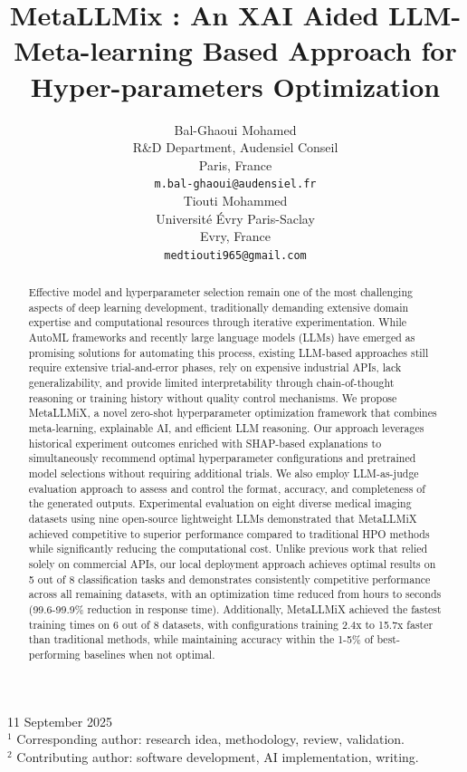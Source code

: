 \documentclass{article}
\title{MetaLLMix : An XAI Aided LLM-Meta-learning Based Approach for Hyper-parameters Optimization
}
\author{
  Bal-Ghaoui Mohamed \footnotemark[1]{} \\ %
  R\&D Department, Audensiel Conseil \\
  Paris, France \\
  \texttt{m.bal-ghaoui@audensiel.fr} \\
  \And
  Tiouti Mohammed \footnotemark[2]{} \\
  Université Évry Paris-Saclay \\%
  Evry, France\\
  \texttt{medtiouti965@gmail.com} \\
}
\begin{document}
\maketitle

\vspace{-1cm}
\begin{center}
    11 September 2025\\
    $^1$ Corresponding author: research idea, methodology, review, validation. \\
    $^2$ Contributing author: software development, AI implementation, writing. \\
\end{center}
\vspace{0.5cm}

\begin{abstract}
Effective model and hyperparameter selection remain one of the most challenging aspects of deep learning development, traditionally demanding extensive domain expertise and computational resources through iterative experimentation. While AutoML frameworks and recently large language models (LLMs) have emerged as promising solutions for automating this process, existing LLM-based approaches still require extensive trial-and-error phases, rely on expensive industrial APIs, lack generalizability, and provide limited interpretability through chain-of-thought reasoning or training history without quality control mechanisms.
We propose MetaLLMiX, a novel zero-shot hyperparameter optimization framework that combines meta-learning, explainable AI, and efficient LLM reasoning. Our approach leverages historical experiment outcomes enriched with SHAP-based explanations to simultaneously recommend optimal hyperparameter configurations and pretrained model selections without requiring additional trials.
We also employ LLM-as-judge evaluation approach to assess and control the format, accuracy, and completeness of the generated outputs.
Experimental evaluation on eight diverse medical imaging datasets using nine open-source lightweight LLMs demonstrated that MetaLLMiX achieved competitive to superior performance compared to traditional HPO methods while significantly reducing the computational cost. Unlike previous work that relied solely on commercial APIs, our local deployment approach achieves optimal results on 5 out of 8 classification tasks and demonstrates consistently competitive performance across all remaining datasets, with an optimization time reduced from hours to seconds (99.6-99.9\% reduction in response time). Additionally, MetaLLMiX achieved the fastest training times on 6 out of 8 datasets, with configurations training 2.4x to 15.7x faster than traditional methods, while maintaining accuracy within the 1-5\% of best-performing baselines when not optimal.
\end{abstract}
\end{document}
